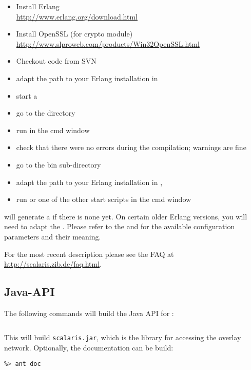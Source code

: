 \begin{itemize}
\item Install Erlang\\
       \url{http://www.erlang.org/download.html}
\item Install OpenSSL (for crypto module)\\
       \url{http://www.slproweb.com/products/Win32OpenSSL.html}
\item Checkout \scalaris{} code from SVN
\item adapt the path to your Erlang installation in 
\item start a 
\item go to the \scalaris{} directory
\item run  in the cmd window
\item check that there were no errors during the compilation;
       warnings are fine
\item go to the bin sub-directory
\item adapt the path to your Erlang installation in ,
\item run  or one of the other start scripts in the cmd window
\end{itemize}

 will generate a  if there is none yet.
On certain older Erlang versions, you will need to adapt the .
Please refer to the  and  for the available
configuration parameters and their meaning.

For the most recent description please see the FAQ at
\url{http://scalaris.zib.de/faq.html}.

\subsection{Java-API}

The following commands will build the Java API for \scalaris{}:
\begin{lstlisting}[language=sh]
%> make java
\end{lstlisting}

This will build {\tt scalaris.jar}, which is the library for accessing
the overlay network. Optionally, the documentation can be build:
\begin{lstlisting}[language=sh]
%> cd java-api
%> ant doc
\end{lstlisting}

